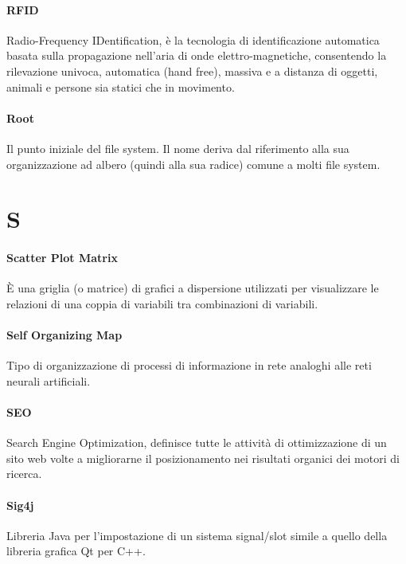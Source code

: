 \documentclass[]{article}
\begin{document}
	\paragraph*{RFID}
	Radio-Frequency IDentification, è la tecnologia di identificazione automatica basata sulla propagazione nell'aria di onde elettro-magnetiche, consentendo la rilevazione univoca, automatica (hand free), massiva e a distanza di oggetti, animali e persone sia statici che in movimento.

	\paragraph*{Root}
	Il punto iniziale del file system. Il nome deriva dal riferimento alla sua organizzazione ad albero (quindi alla sua radice) comune a molti file system.

	\newpage

	\section*{S}

	\paragraph*{Scatter Plot Matrix}
	È una griglia (o matrice) di grafici a dispersione utilizzati per visualizzare le relazioni di una coppia di variabili tra combinazioni di variabili.

	\paragraph*{Self Organizing Map}
	Tipo di organizzazione di processi di informazione in rete analoghi alle reti neurali artificiali.

	\paragraph*{SEO}
	Search Engine Optimization, definisce tutte le attività di ottimizzazione di un sito web volte a migliorarne il posizionamento nei risultati organici dei motori di ricerca.

    \paragraph*{Sig4j}
    Libreria Java per l'impostazione di un sistema signal/slot simile a quello della libreria grafica Qt per C++.
\end{document}
